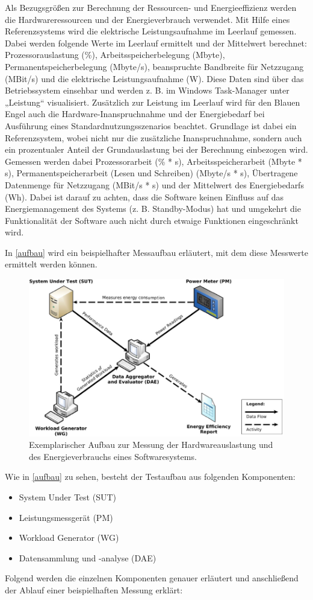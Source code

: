 \documentclass[utf8,biblatex]{lni}
\begin{document}
Als Bezugsgrößen zur Berechnung der Ressourcen- und Energieeffizienz werden die Hardwareressourcen und der Energieverbrauch verwendet. Mit Hilfe eines Referenzsystems wird die elektrische Leistungsaufnahme im Leerlauf gemessen. Dabei werden folgende Werte im Leerlauf ermittelt und der Mittelwert berechnet: Prozessorauslastung (\%), Arbeitsspeicherbelegung (Mbyte), Permanentspeicherbelegung (Mbyte/s), beanspruchte Bandbreite für Netzzugang (MBit/s) und die elektrische Leistungsaufnahme (W). Diese Daten sind über das Betriebssystem einsehbar und werden z. B. im Windows Task-Manager unter „Leistung“ visualisiert. Zusätzlich zur Leistung im Leerlauf wird für den Blauen Engel auch die Hardware-Inanspruchnahme und der Energiebedarf bei Ausführung eines Standardnutzungsszenarios beachtet. Grundlage ist dabei ein Referenzsystem, wobei nicht nur die zusätzliche Inanspruchnahme, sondern auch ein prozentualer Anteil der Grundauslastung bei der Berechnung einbezogen wird. Gemessen werden dabei Prozessorarbeit (\% * s), Arbeitsspeicherarbeit (Mbyte * s), Permanentspeicherarbeit (Lesen und Schreiben) (Mbyte/s * s), Übertragene Datenmenge für Netzzugang (MBit/s * s) und der Mittelwert des Energiebedarfs (Wh). Dabei ist darauf zu achten, dass die Software keinen Einfluss auf das Energiemanagement des Systems (z. B. Standby-Modus) hat und umgekehrt die Funktionalität der Software auch nicht durch etwaige Funktionen eingeschränkt wird. \cite{BlauerEngel20}

In \autoref{aufbau} wird ein beispielhafter Messaufbau erläutert, mit dem diese Messwerte ermittelt werden können. 
\begin{figure}[ht]
\centering
\includegraphics[width=0.9\linewidth]{Messbarkeit_Testaufbau.png}
\caption{{\centering 
Exemplarischer Aufbau zur Messung der Hardwareauslastung und des Energieverbrauchs eines Softwaresystems.\cite{Kern18}
}}
\label{aufbau}
\end{figure}
\newline
Wie in \autoref{aufbau} zu sehen, besteht der Testaufbau aus folgenden Komponenten: 
\begin{itemize}
\item System Under Test (SUT)
\item Leistungsmessgerät (PM)
\item Workload Generator (WG)
\item Datensammlung und -analyse (DAE)
\end{itemize}
Folgend werden die einzelnen Komponenten genauer erläutert und anschließend der Ablauf einer beispielhaften Messung erklärt:
\end{document}
